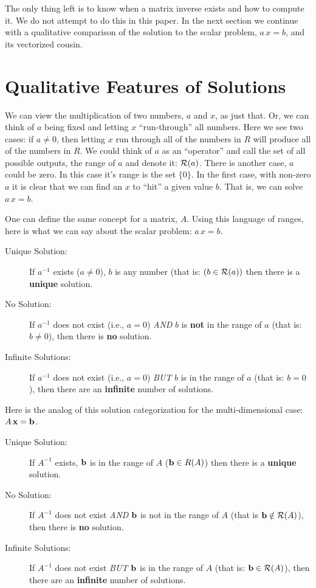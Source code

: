 \documentclass{article}
\begin{document}
The only thing left is to know when a matrix inverse exists and how to compute it.
We do not attempt to do this in this paper. In the next section we continue with
a qualitative comparison of the solution to the scalar problem, $a\, x = b$, 
and its vectorized cousin.


\section{Qualitative Features of Solutions}
We can view the multiplication of two numbers, $a$ and $x$, as just that.
Or, we can think of $a$ being fixed and letting $x$ ``run-through'' all 
numbers. Here we see two cases: if $a \neq 0$, then letting $x$ run
through all of the numbers in $R$ will produce all of the numbers in $R$.
We could think of $a$ as an ``operator'' and call the set of all possible 
outputs, the range of $a$ and denote it: ${\cal R}(a)$.
There is another case, $a$ could be zero. In this case it's range is the
set $\{0\}$. In the first case, with non-zero $a$ it is clear that we can
find an $x$ to ``hit'' a given value $b$. That is, we can solve $a\, x = b$.

One can define the same concept for a matrix, $A$. Using this language
of ranges, here is what we can say about the scalar problem: $a \, x = b$.
\begin{description}
    \item[Unique Solution:]{If $a^{-1}$ exists ($a \neq 0$), $b$ is any number (that is: $(b \in {\cal R}(a))$}
		then there is a {\bf unique\/} solution.
\item[No Solution:]{If $a^{-1}$ does not exist (i.e., $a = 0$) {\em AND\/}
	$b$ is {\bf not\/} in the range of $a$ (that is: $b \ne 0$), then there is {\bf no\/} solution.}
\item[Infinite Solutions:]{If $a^{-1}$ does not exist (i.e., $a = 0$) {\em BUT\/}
	$b$ is in the range of $a$ (that is: $b = 0$), 
	then there are an {\bf infinite\/} number of solutions.}
\end{description}

Here is the analog of this solution categorization for the multi-dimensional case: $A \, {\bf x} = {\bf b}$.
\begin{description}
	\item[Unique Solution:]{If $A^{-1}$ exists, ${\bf b\/}$ is in the range of $A$ (${\bf b} \in R(A)$)
		then there is a {\bf unique\/} solution.}
\item[No Solution:]{If $A^{-1}$ does not exist {\em AND\/}
	${\bf b\/}$ is not in the range of $A$ (that is ${\bf b} \notin {\cal R}(A)$),
then there is {\bf no\/} solution.}  
\item[Infinite Solutions:]{If $A^{-1}$ does not exist {\em BUT\/}
		${\bf b\/}$ is in the range of $A$ (that is: ${\bf b} \in {\cal R}(A)$),
then there are an {\bf infinite\/} number of solutions.} 
\end{description}
\end{document}
